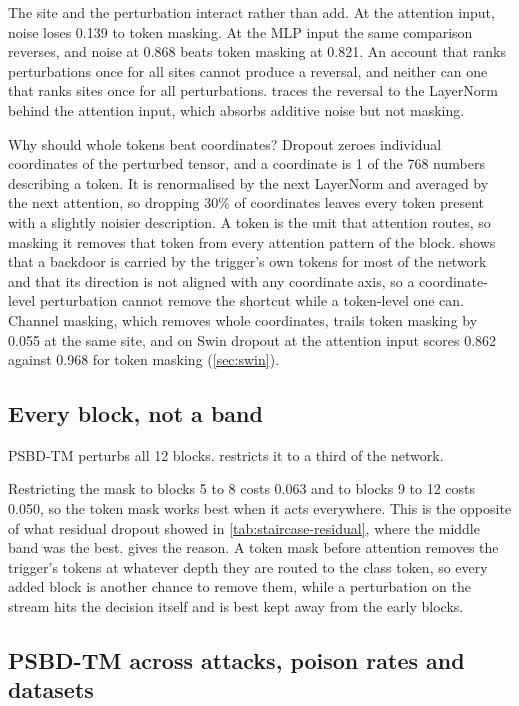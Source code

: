 The site and the perturbation interact rather than add. At the attention input, noise loses 0.139 to token masking. At the MLP input the same comparison reverses, and noise at 0.868 beats token masking at 0.821. An account that ranks perturbations once for all sites cannot produce a reversal, and neither can one that ranks sites once for all perturbations.  traces the reversal to the LayerNorm behind the attention input, which absorbs additive noise but not masking.

Why should whole tokens beat coordinates? Dropout zeroes individual coordinates of the perturbed tensor, and a coordinate is 1 of the 768 numbers describing a token. It is renormalised by the next LayerNorm and averaged by the next attention, so dropping 30\% of coordinates leaves every token present with a slightly noisier description. A token is the unit that attention routes, so masking it removes that token from every attention pattern of the block.  shows that a backdoor is carried by the trigger's own tokens for most of the network and that its direction is not aligned with any coordinate axis, so a coordinate-level perturbation cannot remove the shortcut while a token-level one can. Channel masking, which removes whole coordinates, trails token masking by 0.055 at the same site, and on Swin dropout at the attention input scores 0.862 against 0.968 for token masking (\cref{sec:swin}).

\subsection{Every block, not a band}
\label{sec:results:depth}

PSBD-TM perturbs all 12 blocks.  restricts it to a third of the network.



Restricting the mask to blocks 5 to 8 costs 0.063 and to blocks 9 to 12 costs 0.050, so the token mask works best when it acts everywhere. This is the opposite of what residual dropout showed in \cref{tab:staircase-residual}, where the middle band was the best.  gives the reason. A token mask before attention removes the trigger's tokens at whatever depth they are routed to the class token, so every added block is another chance to remove them, while a perturbation on the stream hits the decision itself and is best kept away from the early blocks.

\subsection{PSBD-TM across attacks, poison rates and datasets}
\label{sec:results:headline}

